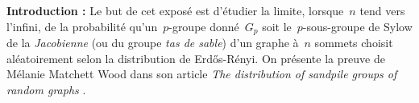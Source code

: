 \vspace*{0.3cm}
\begin{center}
\begin{minipage}{0.85\textwidth}
	\textbf{Introduction :}
	Le but de cet exposé est d'étudier la limite, lorsque~$n$ tend vers l'infini, de la probabilité qu'un~$p$-groupe donné~$G_p$ soit le~$p$-sous-groupe de Sylow de la \emph{Jacobienne} (ou du groupe \emph{tas de sable}) d'un graphe à~$n$ sommets choisit aléatoirement selon la distribution de Erd\H{o}s-Rényi. On présente la preuve de Mélanie Matchett Wood dans son article \emph{The distribution of sandpile groups of random graphs} \cite{main}.
\end{minipage}
\end{center}
